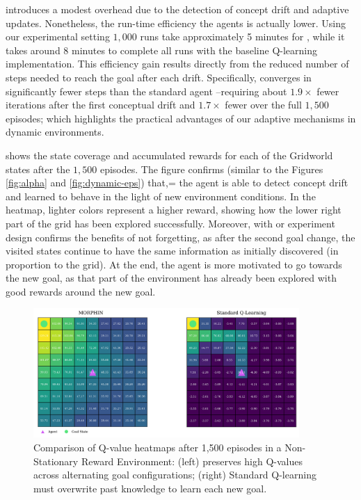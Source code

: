 \adaptiverl introduces a modest overhead due to the detection of concept drift and adaptive updates. 
Nonetheless, the run-time efficiency the agents is actually lower. Using our experimental setting 
$1,000$ runs take approximately 5 minutes for \adaptiverl, while it takes around 8 minutes to 
complete all runs with the baseline Q-learning implementation. This efficiency gain results directly 
from the reduced number of steps needed to reach the goal after each drift. Specifically, \adaptiverl 
converges in significantly fewer steps than the standard agent --requiring about $1.9\times$ fewer 
iterations after the first conceptual drift and $1.7\times$ fewer over the full $1,500$ episodes; which 
highlights the practical advantages of our adaptive mechanisms in dynamic environments.

 shows the state coverage and accumulated rewards for each of the Gridworld 
states after the $1,500$ episodes. The figure confirms (similar to the Figures \ref{fig:alpha} and 
\ref{fig:dynamic-eps}) that,= the agent is able to detect concept drift and learned to behave in the light 
of new environment conditions. In the heatmap, lighter colors represent a higher reward, showing how 
the lower right part of the grid has been explored successfully. Moreover, with or experiment design 
confirms the benefits of not forgetting, as after the second goal change, the visited states continue to 
have the same information as initially discovered (in proportion to the grid). At the end, the agent is 
more motivated to go towards the new goal, as that part of the environment has already been 
explored with good rewards around the new goal.
 
\begin{figure}[hptb]
    \centering
    \includegraphics[width=0.9\textwidth]{figures/q_map_comp}
    \caption{Comparison of Q-value heatmaps after 1,500 episodes in a Non-Stationary Reward Environment: (left) \adaptiverl preserves high Q-values across alternating goal configurations; (right) Standard Q-learning must overwrite past knowledge to learn each new goal.}
    \label{fig:q-value-comp}
\end{figure}

